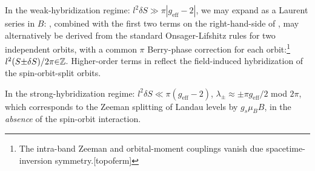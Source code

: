 \documentclass[aps, prb, showpacs, twocolumn, notitlepage, superscriptaddress]{revtex4-1}
\begin{document}
In the weak-hybridization regime: $l^2\delta S  \gg \pi|g_{\text{eff}}{-}2|$, we may expand  as a Laurent series in $B$:
, combined with the first two terms on the right-hand-side of , may alternatively be derived from 
the standard Onsager-Lifshitz rules for two independent orbits, with a common $\pi$ Berry-phase correction for each orbit:\footnote{The intra-band Zeeman and orbital-moment couplings vanish due spacetime-inversion symmetry.[topoferm]} $l^2(S{\pm}\delta S)/2\pi {\in}\mathbb{Z}$. Higher-order terms in  reflect the field-induced hybridization of the spin-orbit-split orbits. 


In the strong-hybridization regime: $l^2\delta S {\ll}\pi(g_{\text{eff}}{-}2)$, $\lambda_{\pm}{\approx}{\pm}\pi g_{\text{eff}} /2$ mod $2\pi$, which corresponds to the Zeeman splitting of Landau levels by $g_{s}\mu_BB$, in the \textit{absence} of the spin-orbit interaction. 







\end{document}
